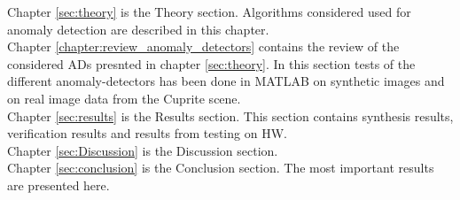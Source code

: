 Chapter \ref{sec:theory} is the Theory section.  Algorithms considered used for anomaly detection are described in this chapter.  \\


Chapter \ref{chapter:review_anomaly_detectors} contains the review of the considered ADs presnted in chapter \ref{sec:theory}. In this section tests of the different anomaly-detectors has been done in MATLAB on synthetic images and on real image data from the Cuprite scene.\\  


Chapter \ref{sec:results} is the Results section. This section contains synthesis results, verification results and results from testing on HW.
\\

Chapter \ref{sec:Discussion} is the Discussion section. 
\\

Chapter \ref{sec:conclusion} is the Conclusion section. The most important results are presented here.  
\\




